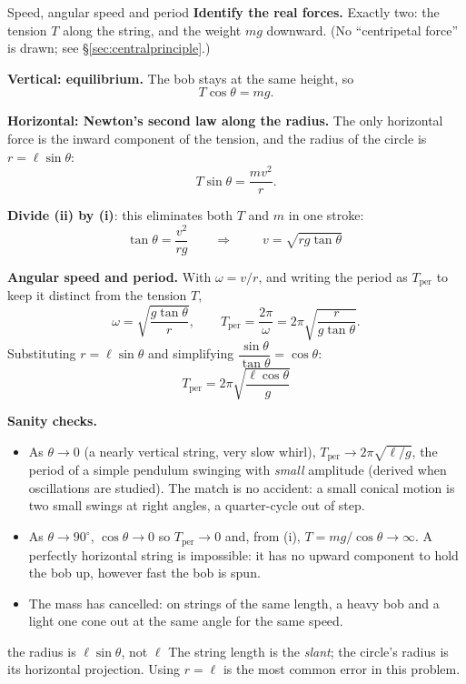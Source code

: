 \begin{derivbox}{Speed, angular speed and period}
 \textbf{Identify the real forces.} Exactly two: the tension $T$ along the string, and the
weight $mg$ downward. (No ``centripetal force'' is drawn; see \S\ref{sec:centralprinciple}.)

 \textbf{Vertical: equilibrium.} The bob stays at the same height, so
\[
T\cos\theta=mg. \tag{i}
\]

 \textbf{Horizontal: Newton's second law along the radius.} The only horizontal force is the
inward component of the tension, and the radius of the circle is $r=\ell\sin\theta$:
\[
T\sin\theta=\frac{mv^{2}}{r}. \tag{ii}
\]

 \textbf{Divide (ii) by (i)}: this eliminates both $T$ and $m$ in one stroke:
\[
\tan\theta=\frac{v^{2}}{rg}
\qquad\Longrightarrow\qquad
\boxed{\;v=\sqrt{rg\tan\theta}\;}
\]

 \textbf{Angular speed and period.} With $\omega=v/r$, and writing the period as $T_{\text{per}}$
to keep it distinct from the tension $T$,
\[
\omega=\sqrt{\frac{g\tan\theta}{r}},
\qquad
T_{\text{per}}=\frac{2\pi}{\omega}=2\pi\sqrt{\frac{r}{g\tan\theta}}.
\]
Substituting $r=\ell\sin\theta$ and simplifying $\dfrac{\sin\theta}{\tan\theta}=\cos\theta$:
\[
\boxed{\;T_{\text{per}}=2\pi\sqrt{\frac{\ell\cos\theta}{g}}\;}
\]

 \textbf{Sanity checks.}
\begin{itemize}
\item As $\theta\to0$ (a nearly vertical string, very slow whirl), $T_{\text{per}}\to2\pi\sqrt{\ell/g}$,
      the period of a simple pendulum swinging with \emph{small} amplitude (derived when oscillations
      are studied). The match is no accident: a small conical motion is two small swings at right
      angles, a quarter-cycle out of step. \checkmark
\item As $\theta\to90^\circ$, $\cos\theta\to0$ so $T_{\text{per}}\to0$ and, from (i),
      $T=mg/\cos\theta\to\infty$. A perfectly horizontal string is impossible: it has no upward
      component to hold the bob up, however fast the bob is spun. \checkmark
\item The mass has cancelled: on strings of the same length, a heavy bob and a light one cone out at
      the same angle for the same speed. \checkmark
\end{itemize}
\end{derivbox}

\begin{trapbox}{the radius is $\ell\sin\theta$, not $\ell$}
The string length is the \emph{slant}; the circle's radius is its horizontal projection. Using $r=\ell$
is the most common error in this problem.
\end{trapbox}

